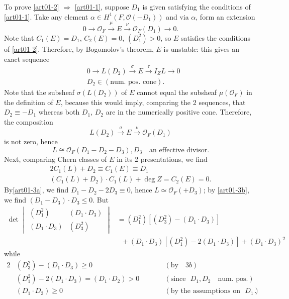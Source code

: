 To prove \eqref{art01-2} $\Rightarrow$ \eqref{art01-1}, suppose
$D_{1}$ is given satisfying the conditions of \eqref{art01-1}. Take
any element $\alpha\in H^{1}(F,\mathscr{O}(-D_{1}))$ and via $\alpha$,
form an extension
$$
0\to \mathscr{O}_{F}\xrightarrow{\mu}E\xrightarrow{\nu}\mathscr{O}_{F}(D_{1})\to 0.
$$
Note that $C_{1}(E)=D_{1}$, $C_{2}(E)=0$, $(D^{2}_{1})>0$, so $E$
satisfies the conditions of \eqref{art01-2}. Therefore, by Bogomolov's
theorem, $E$ is unstable: this gives an exact sequence
\begin{align*}
& 0\to L(D_{2})\xrightarrow{\sigma}E\xrightarrow{\tau}I_{Z}L\to 0\\
& D_{2}\in (\text{num. pos. cone}).
\end{align*}
Note that the subsheaf $\sigma(L(D_{2}))$ of $E$ cannot equal the
subsheaf $\mu(\mathscr{O}_{F})$ in the definition of $E$, because this
would imply, comparing the 2 sequences, that $D_{2}\equiv -D_{1}$
whereas both $D_{1}$, $D_{2}$ are in the numerically positive
cone. Therefore, the composition
$$
L(D_{2})\xrightarrow{\sigma}E\xrightarrow{\nu}\mathscr{O}_{F}(D_{1})
$$
is not zero, hence
$$
L\cong \mathscr{O}_{F}(D_{1}-D_{2}-D_{3}), D_{3}\text{~~ an effective divisor.}
$$
Next, comparing Chern classes of $E$ in its 2 presentations, we find
\begin{subequations}
\begin{gather}
2C_{1}(L)+D_{2}\equiv C_{1}(E)\equiv D_{1}\label{art01-3a}\\
(C_{1}(L)+D_{2})\cdot C_{1}(L)+\deg Z=C_{2}(E)=0.\label{art01-3b}
\end{gather}
\end{subequations}
By\pageoriginale \eqref{art01-3a}, we find $D_{1}-D_{2}-2D_{3}\equiv
0$, hence $L\simeq \mathscr{O}_{F}(+D_{3})$; by \eqref{art01-3b}, we
find $(D_{1}-D_{3})\cdot D_{3}\leq 0$. But
\begin{align*}
\det 
\begin{vmatrix}
(D^{2}_{1}) & (D_{1}\cdot D_{3})\\
(D_{1}\cdot D_{3}) & (D^{2}_{3})
\end{vmatrix}
&=(D^{2}_{1})[(D^{2}_{3})-(D_{1}\cdot D_{3})]\\
&\;\;+(D_{1}\cdot D_{3})[(D^{2}_{1})-2(D_{1}\cdot D_{3})]+(D_{1}\cdot D_{3})^{2}
\end{align*}
while
\begin{alignat*}{2}
& (D^{2}_{3})-(D_{1}\cdot D_{3})\geq 0 &\qquad& (\text{by~~ }3b)\\
& (D^{2}_{1})-2(D_{1}\cdot D_{3})=(D_{1}\cdot D_{2})>0 &\qquad& (\text{since~ }D_{1},D_{2}\text{~~ num. pos.})\\
& (D_{1}\cdot D_{3})\geq 0 &\qquad& (\text{by the assumptions on~ } D_{1}).
\end{alignat*}
